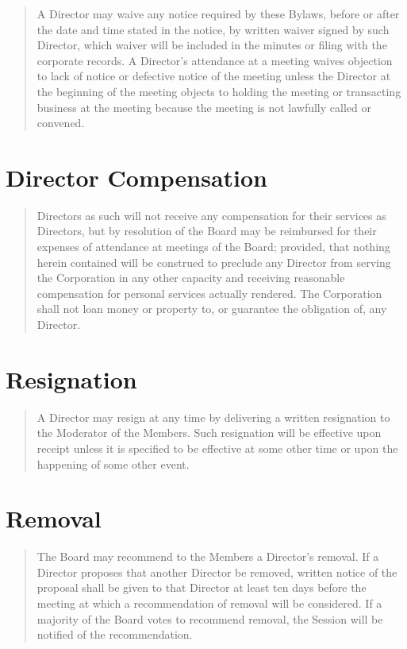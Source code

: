 \documentclass[
]{book}
\begin{document}
\begin{quote}
A Director may waive any notice required by these Bylaws, before or
after the date and time stated in the notice, by written waiver signed
by such Director, which waiver will be included in the minutes or
filing with the corporate records. A Director's attendance at a
meeting waives objection to lack of notice or defective notice of the
meeting unless the Director at the beginning of the meeting objects to
holding the meeting or transacting business at the meeting because the
meeting is not lawfully called or convened.
\end{quote}

\section{Director Compensation}\label{director-compensation}

\begin{quote}
Directors as such will not receive any compensation for their services
as Directors, but by resolution of the Board may be reimbursed for
their expenses of attendance at meetings of the Board; provided, that
nothing herein contained will be construed to preclude any Director
from serving the Corporation in any other capacity and receiving
reasonable compensation for personal services actually rendered. The
Corporation shall not loan money or property to, or guarantee the
obligation of, any Director.
\end{quote}

\section{Resignation}\label{resignation}

\begin{quote}
A Director may resign at any time by delivering a written resignation
to the Moderator of the Members. Such resignation will be effective
upon receipt unless it is specified to be effective at some other time
or upon the happening of some other event.
\end{quote}

\section{Removal}\label{removal}

\begin{quote}
The Board may recommend to the Members a Director's removal. If a
Director proposes that another Director be removed, written notice of
the proposal shall be given to that Director at least ten days before
the meeting at which a recommendation of removal will be considered.
If a majority of the Board votes to recommend removal, the Session
will be notified of the recommendation.
\end{quote}
\end{document}
